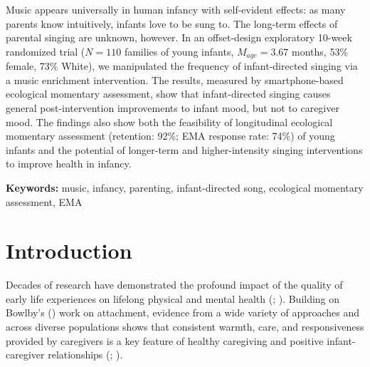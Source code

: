 \documentclass[
]{article}
\begin{document}
\normalsize
\begin{mdframed}[backgroundcolor=gray!20]
Music appears universally in human infancy with self-evident effects: as many parents know intuitively, infants love to be sung to. The long-term effects of parental singing are unknown, however. In an offset-design exploratory 10-week randomized trial ($N = 110$ families of young infants, $M_{age} = 3.67$ months, 53\% female, 73\% White), we manipulated the frequency of infant-directed singing via a music enrichment intervention. The results, measured by smartphone-based ecological momentary assessment, show that infant-directed singing causes general post-intervention improvements to infant mood, but not to caregiver mood. The findings also show both the feasibility of longitudinal ecological momentary assessment (retention: 92\%; EMA response rate: 74\%) of young infants and the potential of longer-term and higher-intensity singing interventions to improve health in infancy.

\textbf{Keywords:} music, infancy, parenting, infant-directed song, ecological momentary assessment, EMA
\end{mdframed}

\linenumbers
\bigskip

\section{Introduction}\label{introduction}

Decades of research have demonstrated the profound impact of the quality
of early life experiences on lifelong physical and mental health
(;
). Building on
Bowlby's () work on attachment, evidence
from a wide variety of approaches and across diverse populations shows
that consistent warmth, care, and responsiveness provided by caregivers
is a key feature of healthy caregiving and positive infant-caregiver
relationships (;
).
\end{document}

